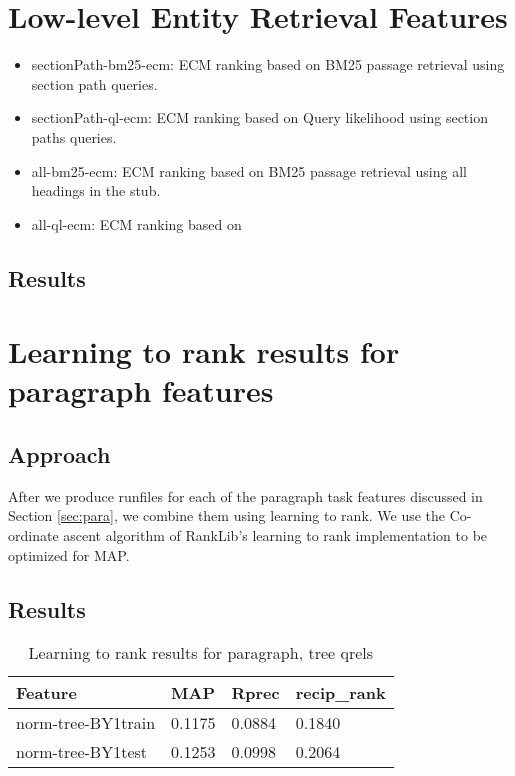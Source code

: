\documentclass{article}
\begin{document}
\section{Low-level Entity Retrieval Features}
\label{sec:entity}





\begin{itemize}
\item sectionPath-bm25-ecm: ECM ranking based on BM25 passage retrieval using section path queries.
\item sectionPath-ql-ecm: ECM ranking based on Query likelihood using section paths queries.
\item all-bm25-ecm: ECM ranking based on BM25 passage retrieval using all headings in the stub.
\item all-ql-ecm: ECM ranking based on 

    \end{itemize}
\subsection{Results}




\section{Learning to rank results for paragraph features}

\subsection{Approach}

After we produce runfiles for each of the paragraph task features discussed in Section \ref{sec:para}, we combine them using learning to rank. We use the Co-ordinate ascent algorithm of RankLib's learning to rank implementation to be optimized for MAP.


\subsection{Results}

\begin{table}[!htb]
\centering
\begin{tabular}{l l l l}
\hline
\textbf{Feature} & \textbf{MAP} & \textbf{Rprec} & \textbf{recip\_rank}\\
\hline
norm-tree-BY1train & 0.1175 & 0.0884 & 0.1840 \\
norm-tree-BY1test & 0.1253 & 0.0998 & 0.2064 \\
\hline
\end{tabular}
\caption{Learning to rank results for paragraph, tree qrels}\label{tab:l2rpara}
\end{table}
\end{document}
